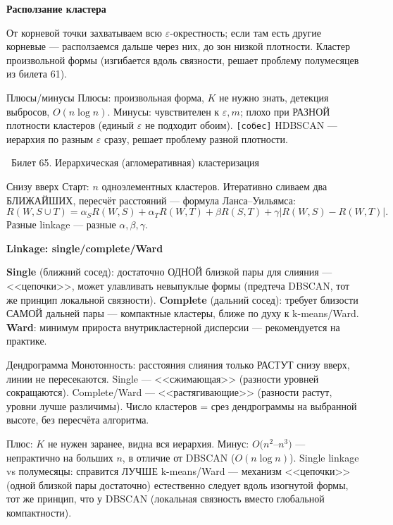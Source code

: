\documentclass[12pt, a4paper]{article}
\newcommand{\bilet}[2]{%
  \vspace{10pt}%
  \noindent\colorbox{qcolor}{\parbox{\dimexpr\linewidth-2\fboxsep\relax}{%
    \color{white}\large\bfseries\strut\ Билет #1. #2%
  }}%
  \nopagebreak\vspace{5pt}\par\nopagebreak%
}
\newcommand{\qsub}[1]{%
  \vspace{5pt}%
  {\bfseries\color{defblue} #1}%
  \par\vspace{2pt}%
}
\begin{document}
\qsub{Расползание кластера}
От корневой точки захватываем всю $\varepsilon$-окрестность; если там есть другие корневые --- расползаемся дальше через них, до зон низкой плотности. Кластер произвольной формы (изгибается вдоль связности, решает проблему полумесяцев из билета 61).

\begin{propbox}{Плюсы/минусы}
Плюсы: произвольная форма, $K$ не нужно знать, детекция выбросов, $O(n\log n)$. Минусы: чувствителен к $\varepsilon,m$; плохо при РАЗНОЙ плотности кластеров (единый $\varepsilon$ не подходит обоим). \texttt{[собес]} HDBSCAN --- иерархия по разным $\varepsilon$ сразу, решает проблему разной плотности.
\end{propbox}

\bilet{65}{Иерархическая (агломеративная) кластеризация}

\begin{defbox}{Снизу вверх}
Старт: $n$ одноэлементных кластеров. Итеративно сливаем два БЛИЖАЙШИХ, пересчёт расстояний --- формула Ланса--Уильямса:
\[
  R(W,S\cup T) = \alpha_S R(W,S)+\alpha_T R(W,T)+\beta R(S,T)+\gamma|R(W,S)-R(W,T)|.
\]
Разные linkage --- разные $\alpha,\beta,\gamma$.
\end{defbox}

\qsub{Linkage: single/complete/Ward}
\textbf{Single} (ближний сосед): достаточно ОДНОЙ близкой пары для слияния --- <<цепочки>>, может улавливать невыпуклые формы (предтеча DBSCAN, тот же принцип локальной связности). \textbf{Complete} (дальний сосед): требует близости САМОЙ дальней пары --- компактные кластеры, ближе по духу к k-means/Ward. \textbf{Ward}: минимум прироста внутрикластерной дисперсии --- рекомендуется на практике.

\begin{propbox}{Дендрограмма}
Монотонность: расстояния слияния только РАСТУТ снизу вверх, линии не пересекаются. Single --- <<сжимающая>> (разности уровней сокращаются). Complete/Ward --- <<растягивающие>> (разности растут, уровни лучше различимы). Число кластеров = срез дендрограммы на выбранной высоте, без пересчёта алгоритма.
\end{propbox}

\begin{fishkabox}
Плюс: $K$ не нужен заранее, видна вся иерархия. Минус: $O(n^2$--$n^3)$ --- непрактично на больших $n$, в отличие от DBSCAN ($O(n\log n)$).
Single linkage vs полумесяцы: справится ЛУЧШЕ k-means/Ward --- механизм <<цепочки>> (одной близкой пары достаточно) естественно следует вдоль изогнутой формы, тот же принцип, что у DBSCAN (локальная связность вместо глобальной компактности).
\end{fishkabox}
\end{document}
